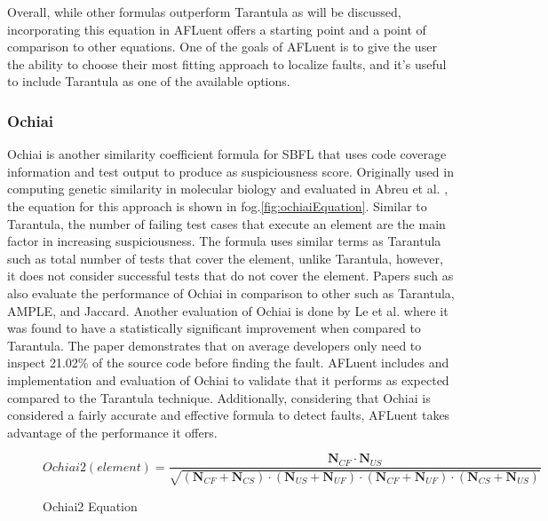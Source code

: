 Overall, while other formulas outperform Tarantula as will be discussed,
incorporating this equation in AFLuent offers a starting point and a point of
comparison to other equations. One of the goals of AFLuent is to give the user
the ability to choose their most fitting approach to localize faults, and it's
useful to include Tarantula as one of the available options.

\subsubsection{Ochiai}
\label{subsubsec:ochiai_lit}

Ochiai is another similarity coefficient formula for SBFL that uses code
coverage information and test output to produce as suspiciousness score.
Originally used in computing genetic similarity in molecular biology and
evaluated in Abreu et al. \cite{Abreu2006Ochiai}, the equation for this approach
is shown in fog.\ref{fig:ochiaiEquation}. Similar to Tarantula, the number of
failing test cases that execute an element are the main factor in increasing
suspiciousness. The formula uses similar terms as Tarantula such as total number
of tests that cover the element, unlike Tarantula, however, it does not consider
successful tests that do not cover the element.
Papers such as \cite{Abreu2006Ochiai,ABREU20091780} also evaluate the
performance of Ochiai in comparison to other such as Tarantula, AMPLE, and
Jaccard. Another evaluation of Ochiai is done by Le et al. \cite{le2013theory}
where it was found to have a statistically significant improvement when compared
to Tarantula. The paper demonstrates that on average developers only need to
inspect 21.02\% of the source code before finding the fault.
AFLuent includes and implementation and evaluation of Ochiai to
validate that it performs as expected compared to the Tarantula technique.
Additionally, considering that Ochiai is considered a fairly accurate and
effective formula to detect faults, AFLuent takes advantage of the performance
it offers.

\begin{figure}[!htb]
	\begin{center}
		\begin{equation}
			Ochiai2(element) = \frac{\textbf{N$_{CF}$}\cdot{\textbf{N$_{US}$}}}{\sqrt{(\textbf{N$_{CF}$}  + \textbf{N$_{CS}$}) \cdot (\textbf{N$_{US}$}  + \textbf{N$_{UF}$}) \cdot (\textbf{N$_{CF}$}  + \textbf{N$_{UF}$}) \cdot (\textbf{N$_{CS}$}  + \textbf{N$_{US}$})}}
		\end{equation}
		\caption{\label{fig:ochiai2Equation} Ochiai2 Equation\cite{wong2016survey}}
	\end{center}
\end{figure}

